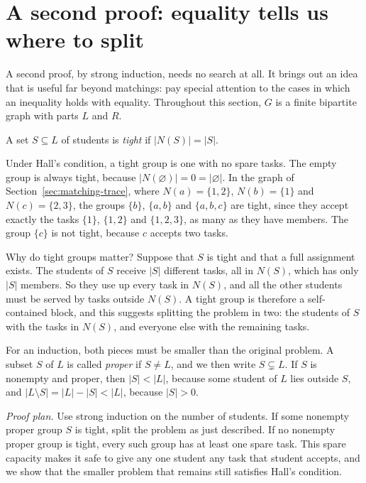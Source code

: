 \section{A second proof: equality tells us where to split}\label{ch09:sec:inductive}
A second proof, by strong induction, needs no search at all. It brings out an idea that is useful far beyond matchings: pay special attention to the cases in which an inequality holds with equality. Throughout this section, $G$ is a finite bipartite graph with parts $L$ and $R$.

\par\noindent\begin{minipage}{\linewidth}
\begin{definition}\label{ch09:def:tight}
A set $S\subseteq L$ of students is \emph{tight} if $|N(S)|=|S|$.
\end{definition}
\end{minipage}\par

Under Hall's condition, a tight group is one with no spare tasks. The empty group is always tight, because $|N(\varnothing)|=0=|\varnothing|$. In the graph of Section~\ref{sec:matching-trace}, where $N(a)=\{1,2\}$, $N(b)=\{1\}$ and $N(c)=\{2,3\}$, the groups $\{b\}$, $\{a,b\}$ and $\{a,b,c\}$ are tight, since they accept exactly the tasks $\{1\}$, $\{1,2\}$ and $\{1,2,3\}$, as many as they have members. The group $\{c\}$ is not tight, because $c$ accepts two tasks.

Why do tight groups matter? Suppose that $S$ is tight and that a full assignment exists. The students of $S$ receive $|S|$ different tasks, all in $N(S)$, which has only $|S|$ members. So they use up every task in $N(S)$, and all the other students must be served by tasks outside $N(S)$. A tight group is therefore a self-contained block, and this suggests splitting the problem in two: the students of $S$ with the tasks in $N(S)$, and everyone else with the remaining tasks.

For an induction, both pieces must be smaller than the original problem. A subset $S$ of $L$ is called \emph{proper} if $S\ne L$, and we then write $S\subsetneq L$. If $S$ is nonempty and proper, then $|S|<|L|$, because some student of $L$ lies outside $S$, and $|L\setminus S|=|L|-|S|<|L|$, because $|S|>0$.

\noindent\textit{Proof plan.} Use strong induction on the number of students. If some nonempty proper group $S$ is tight, split the problem as just described. If no nonempty proper group is tight, every such group has at least one spare task. This spare capacity makes it safe to give any one student any task that student accepts, and we show that the smaller problem that remains still satisfies Hall's condition.

